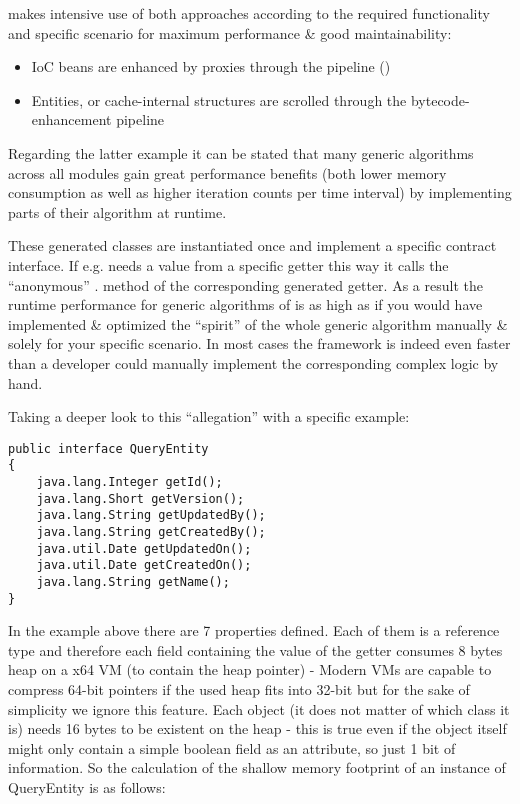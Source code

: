 \AMBETH{} makes intensive use of both approaches according to the required functionality and specific scenario for maximum performance \& good maintainability:
\begin{itemize}
	\item IoC beans are enhanced by proxies through the  pipeline ()
	\item Entities,  or cache-internal structures are scrolled through the bytecode-enhancement pipeline
\end{itemize}
Regarding the latter example it can be stated that many generic algorithms across all modules gain great performance benefits (both lower memory consumption as well as higher iteration counts per time interval) by implementing parts of their algorithm at runtime.


These generated classes are instantiated once and implement a specific contract interface. If \AMBETH{} e.g. needs a value from a specific getter this way it calls the ``anonymous'' . method of the corresponding generated getter. As a result the runtime performance for generic algorithms of \AMBETH{} is as high as if you would have implemented \& optimized the ``spirit'' of the whole generic algorithm manually \& solely for your specific scenario. In most cases the framework is indeed even faster than a developer could manually implement the corresponding complex logic by hand.

Taking a deeper look to this ``allegation'' with a specific example:
\begin{lstlisting}[style=Java,caption={Example entity definition (Java)}]
public interface QueryEntity
{
	java.lang.Integer getId();
	java.lang.Short getVersion();
	java.lang.String getUpdatedBy();
	java.lang.String getCreatedBy();
	java.util.Date getUpdatedOn();
	java.util.Date getCreatedOn();
	java.lang.String getName();
}
\end{lstlisting}

In the example above there are 7 properties defined. Each of them is a reference type and therefore each field containing the value of the getter consumes 8 bytes heap on a x64 VM (to contain the heap pointer) - Modern VMs are capable to compress 64-bit pointers if the used heap fits into 32-bit but for the sake of simplicity we ignore this feature. Each object (it does not matter of which class it is) needs 16 bytes to be existent on the heap - this is true even if the object itself might only contain a simple boolean field as an attribute, so just 1 bit of information. So the calculation of the shallow memory footprint of an instance of QueryEntity is as follows:\\

